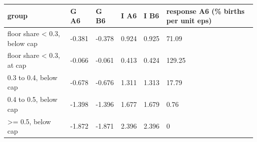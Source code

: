 \begingroup\small
\setlength{\tabcolsep}{3pt}
\renewcommand{\arraystretch}{1.04}
\begin{tabularx}{\linewidth}{XXXXXX}
\toprule
group & G A6 & G B6 & I A6 & I B6 & response A6 (\% births per unit eps) \\
\midrule
floor share \textless{} 0.3, below cap & -0.381 & -0.378 & 0.924 & 0.925 & 71.09 \\
floor share \textless{} 0.3, at cap & -0.066 & -0.061 & 0.413 & 0.424 & 129.25 \\
0.3 to 0.4, below cap & -0.678 & -0.676 & 1.311 & 1.313 & 17.79 \\
0.4 to 0.5, below cap & -1.398 & -1.396 & 1.677 & 1.679 & 0.76 \\
\textgreater{}= 0.5, below cap & -1.872 & -1.871 & 2.396 & 2.396 & 0 \\
\bottomrule
\end{tabularx}
\endgroup
